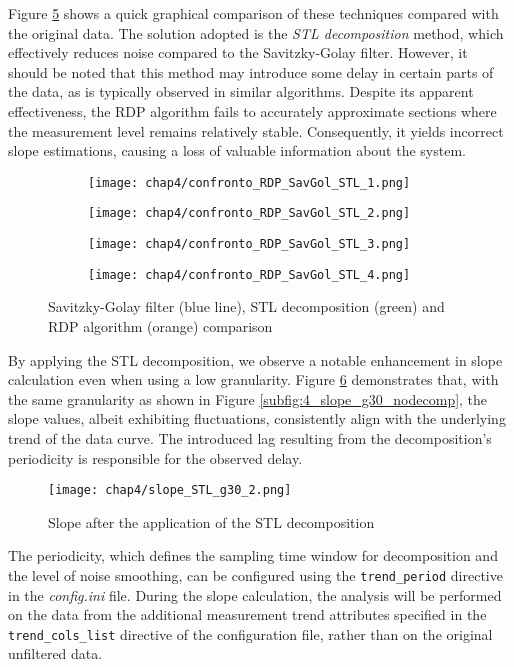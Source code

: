 Figure \ref{fig:4_smoothing_comparison} shows a quick graphical comparison of these techniques compared with the original data. The solution adopted is the \textit{STL decomposition} method, which effectively reduces noise compared to the Savitzky-Golay filter. However, it should be noted that this method may introduce some delay in certain parts of the data, as is typically observed in similar algorithms. Despite its apparent effectiveness, the RDP algorithm fails to accurately approximate sections where the measurement level remains relatively stable. Consequently, it yields incorrect slope estimations, causing a loss of valuable information about the system.

\begin{figure}[H]
	\centering
	\begin{subfigure}{0.48\textwidth}
		\texttt{[image: chap4/confronto\_RDP\_SavGol\_STL\_1.png]}
		\caption{}
		\label{subfig:4_smoothing1}
	\end{subfigure}
	\hfill
	\begin{subfigure}{0.48\textwidth}
		\texttt{[image: chap4/confronto\_RDP\_SavGol\_STL\_2.png]}
		\caption{}
		\label{subfig:4_smoothing2}
	\end{subfigure}
	\begin{subfigure}{0.48\textwidth}
		\texttt{[image: chap4/confronto\_RDP\_SavGol\_STL\_3.png]}
		\caption{}
		\label{subfig:4_smoothing3}
	\end{subfigure}
	\hfill
	\begin{subfigure}{0.48\textwidth}
		\texttt{[image: chap4/confronto\_RDP\_SavGol\_STL\_4.png]}
		\caption{}
		\label{subfig:4_smoothing4}
	\end{subfigure}
	\caption{Savitzky-Golay filter (blue line), STL decomposition (green) and RDP algorithm (orange) comparison}
	\label{fig:4_smoothing_comparison}
\end{figure}
By applying the STL decomposition, we observe a notable enhancement in slope calculation even when using a low granularity. Figure \ref{fig:4_STL_decomp_results} demonstrates that, with the same granularity as shown in Figure \ref{subfig:4_slope_g30_nodecomp}, the slope values, albeit exhibiting fluctuations, consistently align with the underlying trend of the data curve. The introduced lag resulting from the decomposition's periodicity is responsible for the observed delay.

\begin{figure}[ht]
	\centering
	\texttt{[image: chap4/slope\_STL\_g30\_2.png]}
	\caption{Slope after the application of the STL decomposition}
	\label{fig:4_STL_decomp_results}
\end{figure}
The periodicity, which defines the sampling time window for decomposition and the level of noise smoothing, can be configured using the \texttt{trend\_period} directive in the \textit{config.ini} file.\newline
During the slope calculation, the analysis will be performed on the data from the additional measurement trend attributes specified in the \texttt{trend\_cols\_list} directive of the configuration file, rather than on the original unfiltered data.

